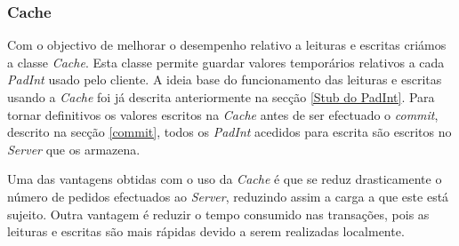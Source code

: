 \subsubsection{Cache}
\label{cache}
Com o objectivo de melhorar o desempenho relativo a leituras e escritas criámos a classe \textit{Cache}. Esta classe permite guardar valores temporários relativos a cada \textit{PadInt} usado pelo cliente. A ideia base do funcionamento das leituras e escritas usando a \textit{Cache} foi já descrita anteriormente na secção \ref{Stub do PadInt}. Para tornar definitivos os valores escritos na \textit{Cache} antes de ser efectuado o \textit{commit}, descrito na secção \ref{commit}, todos os \textit{PadInt} acedidos para escrita são escritos no \textit{Server} que os armazena.

Uma das vantagens obtidas com o uso da \textit{Cache} é que se reduz drasticamente o número de pedidos efectuados ao \textit{Server}, reduzindo assim a carga a que este está sujeito. Outra vantagem é reduzir o tempo consumido nas transações, pois as leituras e escritas são mais rápidas devido a serem realizadas localmente.